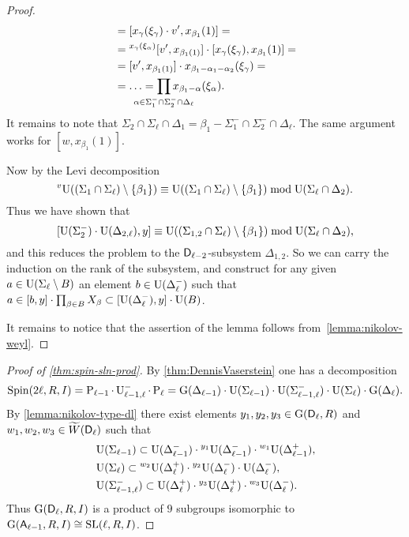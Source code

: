 \begin{proof}
\begin{align*}
[v, x_{\beta_1}(1)] & = [x_\gamma(\xi_\gamma)\cdot v', x_{\beta_1}(1)] = \\
& = {}^{x_\gamma(\xi_\alpha)}[v', x_{\beta_1(1)}] \cdot [x_\gamma(\xi_\gamma), x_{\beta_1}(1)] = \\
& = [v', x_{\beta_1(1)}]\cdot x_{\beta_1-\alpha_1-\alpha_2}(\xi_\gamma) = \\
& = \ldots = \prod_{\mathclap{\alpha\in\Sigma_1^- \cap \Sigma_2^- \cap \Delta_\ell}} x_{\beta_1-\alpha}(\xi_\alpha).
\end{align*}
It remains to note that $\Sigma_2 \cap \Sigma_\ell \cap \Delta_1 = \beta_1 - \Sigma_1^- \cap \Sigma_2^- \cap \Delta_\ell$. The same argument works for $[w, x_{\beta_1}(1)]$.

Now by the Levi decomposition
\[ {}^v\!\operatorname{U}((\Sigma_1\cap\Sigma_\ell)\setminus\{\beta_1\}) \equiv \operatorname{U}((\Sigma_1\cap\Sigma_\ell)\setminus\{\beta_1\}) \bmod \operatorname{U}(\Sigma_\ell\cap\Delta_2). \]
Thus we have shown that
\[ [\operatorname{U}(\Sigma_2^-)\cdot\operatorname{U}(\Delta_{2,\ell}),y] \equiv \operatorname{U}((\Sigma_{1,2}\cap\Sigma_\ell)\setminus\{\beta_1\}) \bmod \operatorname{U}(\Sigma_\ell\cap\Delta_2), \]
and this reduces the problem to the $\mathsf{D}_{\ell-2}$-subsystem $\Delta_{1,2}$. So we can carry the induction on the rank of the subsystem, and construct for any given $a\in\operatorname{U}(\Sigma_\ell\setminus B)$ an element $b\in\operatorname{U}(\Delta_\ell^-)$ such that $a\in[b,y]\cdot\prod_{\beta\in B}X_\beta\subset[\operatorname{U}(\Delta_\ell^-),y]\cdot\operatorname{U}(B)$.

It remains to notice that the assertion of the lemma follows from~\cref{lemma:nikolov-weyl}.
\end{proof}
\begin{proof}[Proof of \cref{thm:spin-sln-prod}]
By \cref{thm:DennisVaserstein} one has a decomposition
\[ \operatorname{Spin}(2\ell,R,I) = \operatorname{P}_{\ell-1}\cdot\operatorname{U}_{\ell-1,\ell}^-\cdot\operatorname{P}_{\ell} = \operatorname{G}(\Delta_{\ell-1})\cdot\operatorname{U}(\Sigma_{\ell-1})\cdot\operatorname{U}(\Sigma_{\ell-1,\ell}^-)\cdot\operatorname{U}(\Sigma_{\ell})\cdot\operatorname{G}(\Delta_\ell). \]
By \cref{lemma:nikolov-type-dl} there exist elements $y_1,y_2,y_3\in\operatorname{G}(\mathsf{D}_\ell,R)$ and $w_1,w_2,w_3\in\widetilde{W}(\mathsf{D}_\ell)$ such that
\begin{align*}
& \operatorname{U}(\Sigma_{\ell-1}) \subset \operatorname{U}(\Delta_{\ell-1}^-) \cdot {}^{y_1}\!\operatorname{U}(\Delta_{\ell-1}^-) \cdot {}^{w_1}\!\operatorname{U}(\Delta_{\ell-1}^+), \\
& \operatorname{U}(\Sigma_\ell) \subset {}^{w_2}\!\operatorname{U}(\Delta_\ell^+) \cdot {}^{y_2}\!\operatorname{U}(\Delta_\ell^-) \cdot \operatorname{U}(\Delta_\ell^-), \\
& \operatorname{U}(\Sigma_{\ell-1,\ell}^-) \subset \operatorname{U}(\Delta_\ell^+) \cdot {}^{y_3}\!\operatorname{U}(\Delta_\ell^+) \cdot {}^{w_3}\!\operatorname{U}(\Delta_\ell^-).
\end{align*}
Thus $\operatorname{G}(\mathsf{D}_\ell,R,I)$ is a product of $9$ subgroups isomorphic to $\operatorname{G}(\mathsf{A}_{\ell-1},R,I)\cong\operatorname{SL}(\ell,R,I)$.
\end{proof}